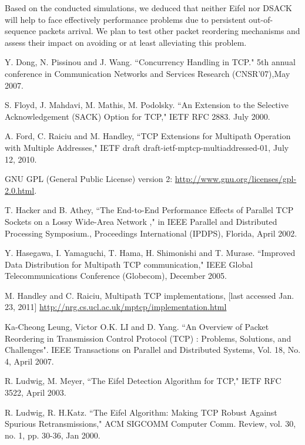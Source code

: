 \documentclass{sig-alternate}
\begin{document}
Based on the conducted simulations, we deduced that neither Eifel nor DSACK will help to face effectively performance problems due to persistent out-of-sequence packets arrival. We plan to test other packet reordering mechanisms and assess their impact on avoiding or at least alleviating this problem.

\begin{thebibliography}{1}
  
Y. Dong, N. Pissinou and J. Wang. ``Concurrency Handling in TCP." 5th annual conference in Communication Networks and Services Research (CNSR'07),May  2007.

S. Floyd, J. Mahdavi, M. Mathis, M. Podolsky. ``An Extension to the Selective Acknowledgement  (SACK) Option for TCP," IETF RFC 2883. July 2000.

A. Ford, C. Raiciu and M. Handley, ``TCP Extensions for Multipath Operation with Multiple Addresses," IETF draft draft-ietf-mptcp-multiaddressed-01, July 12, 2010.

GNU GPL (General Public License) version 2: \url{http://www.gnu.org/licenses/gpl-2.0.html}.

T. Hacker and B. Athey, ``The End-to-End Performance Effects of Parallel TCP Sockets on a Lossy Wide-Area Network ," in IEEE Parallel and Distributed Processing Symposium., Proceedings International (IPDPS), Florida, April 2002.

Y. Hasegawa, I. Yamaguchi, T. Hama, H. Shimonishi and T. Murase. ``Improved Data Distribution for Multipath TCP communication," IEEE Global Telecommunications Conference (Globecom), December 2005.

M. Handley and C. Raiciu, Multipath TCP implementations, [last accessed Jan. 23, 2011] \url{http://nrg.cs.ucl.ac.uk/mptcp/implementation.html}

Ka-Cheong Leung, Victor O.K. LI and D. Yang. ``An Overview of Packet Reordering in Transmission Control Protocol (TCP) : Problems, Solutions, and Challenges". IEEE Transactions on Parallel and Distributed Systems, Vol. 18, No. 4, April 2007.

R. Ludwig,  M. Meyer, ``The Eifel Detection Algorithm for TCP," IETF RFC 3522, April 2003.

R. Ludwig, R. H.Katz. ``The Eifel Algorithm: Making TCP Robust Against Spurious Retransmissions," ACM SIGCOMM Computer Comm. Review, vol. 30, no. 1, pp. 30-36, Jan 2000.


\end{thebibliography}
\end{document}
